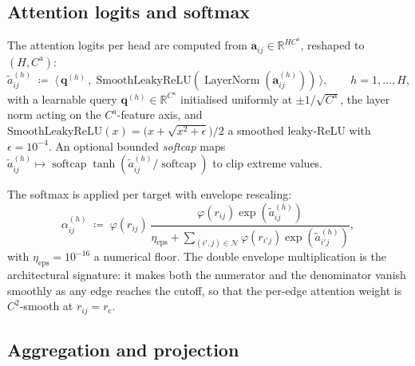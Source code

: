 \documentclass[11pt,a4paper]{article}
\DeclareMathOperator{\LN}{LayerNorm}
\DeclareMathOperator{\softcap}{softcap}
\newcommand{\R}{\mathbb{R}}
\newcommand{\rcut}{r_{\mathrm{c}}}
\newcommand{\Nb}{\mathcal{N}}
\theoremstyle{plain}
\theoremstyle{definition}
\theoremstyle{remark}
\begin{document}
\subsection{Attention logits and softmax}\label{sec:attn-soft}

The attention logits per head are computed from $\bm{a}_{ij}\in\R^{H
        C^{\mathrm{a}}}$, reshaped to $(H,C^{\mathrm{a}})$:
\begin{equation}\label{eq:attn-logit}
    \widetilde a^{(h)}_{ij}\;\coloneqq\;\bigl\langle\,\bm{q}^{(h)}\,,\;\mathrm{SmoothLeakyReLU}(\LN(\bm{a}^{(h)}_{ij}))\,\bigr\rangle,\qquad h=1,\dots,H,
\end{equation}
with a learnable query $\bm{q}^{(h)}\in\R^{C^{\mathrm{a}}}$ initialised uniformly at $\pm 1/\sqrt{C^{\mathrm{a}}}$, the layer norm acting on the $C^{\mathrm{a}}$-feature axis, and
$\mathrm{SmoothLeakyReLU}(x)=\bigl(x+\sqrt{x^2+\epsilon}\bigr)/2$ a smoothed leaky-ReLU with $\epsilon=10^{-4}$.
An optional bounded \emph{softcap} maps $\widetilde a^{(h)}_{ij}\mapsto\softcap\tanh(\widetilde a^{(h)}_{ij}/\softcap)$ to clip extreme values.

The softmax is applied per target with envelope rescaling:
\begin{equation}\label{eq:attn-softmax}
    \alpha^{(h)}_{ij}\;\coloneqq\;\varphi(r_{ij})\,\frac{\varphi(r_{ij})\exp(\widetilde a^{(h)}_{ij})}{\eta_{\mathrm{eps}}+\sum_{(i',j)\in\Nb}\varphi(r_{i'j})\exp(\widetilde a^{(h)}_{i'j})},
\end{equation}
with $\eta_{\mathrm{eps}}=10^{-16}$ a numerical floor.
The double envelope multiplication is the architectural signature: it makes both the numerator and the denominator vanish smoothly as any edge reaches the cutoff, so that the per-edge attention weight is $C^2$-smooth at $r_{ij}=\rcut$.

\subsection{Aggregation and projection}\label{sec:attn-agg}
\end{document}

